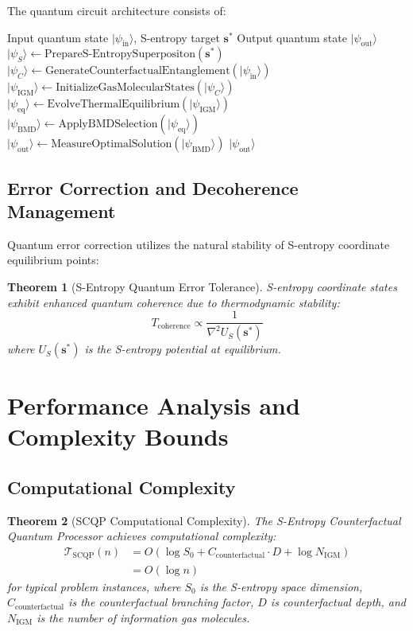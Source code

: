 \documentclass[12pt,a4paper]{article}
\newtheorem{theorem}{Theorem}
\begin{document}
The quantum circuit architecture consists of:

\begin{algorithm}
\caption{Quantum Circuit Execution}
\begin{algorithmic}[1]
\Require Input quantum state $|\psi_{\text{in}}\rangle$, S-entropy target $\mathbf{s}^*$
\Ensure Output quantum state $|\psi_{\text{out}}\rangle$
\State $|\psi_S\rangle \leftarrow \text{PrepareS-EntropySuperpositon}(\mathbf{s}^*)$
\State $|\psi_C\rangle \leftarrow \text{GenerateCounterfactualEntanglement}(|\psi_{\text{in}}\rangle)$
\State $|\psi_{\text{IGM}}\rangle \leftarrow \text{InitializeGasMolecularStates}(|\psi_C\rangle)$
\State $|\psi_{\text{eq}}\rangle \leftarrow \text{EvolveThermalEquilibrium}(|\psi_{\text{IGM}}\rangle)$
\State $|\psi_{\text{BMD}}\rangle \leftarrow \text{ApplyBMDSelection}(|\psi_{\text{eq}}\rangle)$
\State $|\psi_{\text{out}}\rangle \leftarrow \text{MeasureOptimalSolution}(|\psi_{\text{BMD}}\rangle)$
\Return $|\psi_{\text{out}}\rangle$
\end{algorithmic}
\end{algorithm}

\subsection{Error Correction and Decoherence Management}

Quantum error correction utilizes the natural stability of S-entropy coordinate equilibrium points:

\begin{theorem}[S-Entropy Quantum Error Tolerance]
S-entropy coordinate states exhibit enhanced quantum coherence due to thermodynamic stability:
\begin{equation}
T_{\text{coherence}} \propto \frac{1}{\nabla^2 U_S(\mathbf{s}^*)}
\end{equation}
where $U_S(\mathbf{s}^*)$ is the S-entropy potential at equilibrium.
\end{theorem}

\section{Performance Analysis and Complexity Bounds}

\subsection{Computational Complexity}

\begin{theorem}[SCQP Computational Complexity]
The S-Entropy Counterfactual Quantum Processor achieves computational complexity:
\begin{align}
\mathcal{T}_{\text{SCQP}}(n) &= O(\log S_0 + C_{\text{counterfactual}} \cdot D + \log N_{\text{IGM}}) \\
&= O(\log n)
\end{align}
for typical problem instances, where $S_0$ is the S-entropy space dimension, $C_{\text{counterfactual}}$ is the counterfactual branching factor, $D$ is counterfactual depth, and $N_{\text{IGM}}$ is the number of information gas molecules.
\end{theorem}
\end{document}
